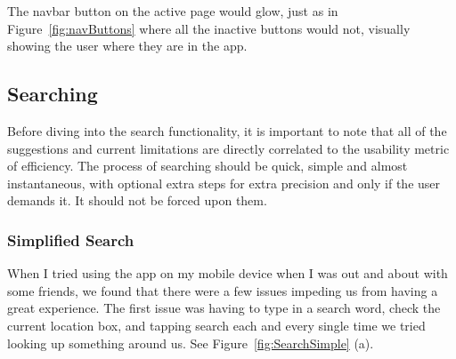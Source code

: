 \documentclass[11pt]{article}
\begin{document}
The navbar button on the active page would glow, just as in Figure~\ref{fig:navButtons} where all the inactive buttons would not, visually showing the user where they are in the app.

\subsection{Searching}
Before diving into the search functionality, it is important to note that all of the suggestions and current limitations are directly correlated to the usability metric of efficiency. The process of searching should be quick, simple and almost instantaneous, with optional extra steps for extra precision and only if the user demands it. It should not be forced upon them.

\subsubsection{Simplified Search}
When I tried using the app on my mobile device when I was out and about with some friends, we found that there were a few issues impeding us from having a great experience. The first issue was having to type in a search word, check the current location box, and tapping search each and every single time we tried looking up something around us. See Figure~\ref{fig:SearchSimple} (a).
\end{document}

